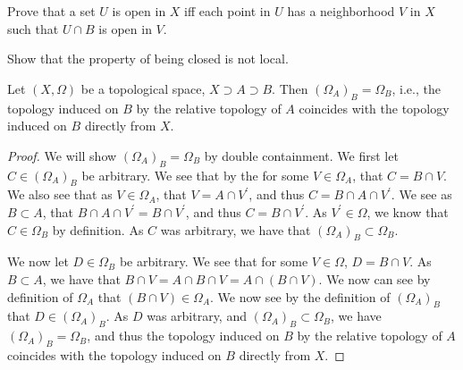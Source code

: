 \begin{minorEx}%
Prove that a set $U$ is open in $X$ iff each point in $U$ has a neighborhood $V$ in $X$ such that $U \cap B$ is open in $V$.
\end{minorEx}

\begin{minorEx}%
Show that the property of being closed is not local.
\end{minorEx}

\begin{majorEx}%
Let $(X, \Omega)$ be a topological space, $X \supset A \supset B$. Then $(\Omega_A)_B=\Omega_B$, i.e., the topology induced on $B$ by the relative topology of $A$ coincides with the topology induced on $B$ directly from $X$.
\end{majorEx}

\begin{proof}
  We will show $(\Omega_A)_B=\Omega_B$ by double containment. We first
  let $C \in (\Omega_A)_B$ be arbitrary. We see that by the for some
  $V \in \Omega_A$, that $C = B \cap V$. We also see that as $V \in
  \Omega_A$, that $V = A \cap  V^\prime$, and thus $C = B \cap A \cap
  V^\prime$. We see as $B\subset A$, that 
  $B \cap A \cap V^\prime=B \cap V^\prime$, and thus $C =B \cap
  V^\prime$. As $V^\prime \in \Omega$, we know that $C \in \Omega_B$
  by definition. As $C$ was arbitrary, we have that 
  $(\Omega_A)_B \subset \Omega_B$.

  We now let $D \in \Omega_B$ be arbitrary. We see that for some $V
  \in \Omega$, $D = B \cap V$. As $B\subset A$, we have that $B \cap V
  = A\cap B \cap V=A\cap (B \cap V)$. We now can see by definition of
  $\Omega_A$ that $(B \cap V) \in \Omega_A$. We now see by the
  definition of $(\Omega_A)_B$ that $D\in (\Omega_A)_B$. As $D$ was
  arbitrary, and $(\Omega_A)_B \subset \Omega_B$, we have 
  $(\Omega_A)_B = \Omega_B$, and thus the topology induced on $B$ by
  the relative topology of $A$ coincides with the topology induced on
  $B$ directly from $X$.
  
\end{proof}

